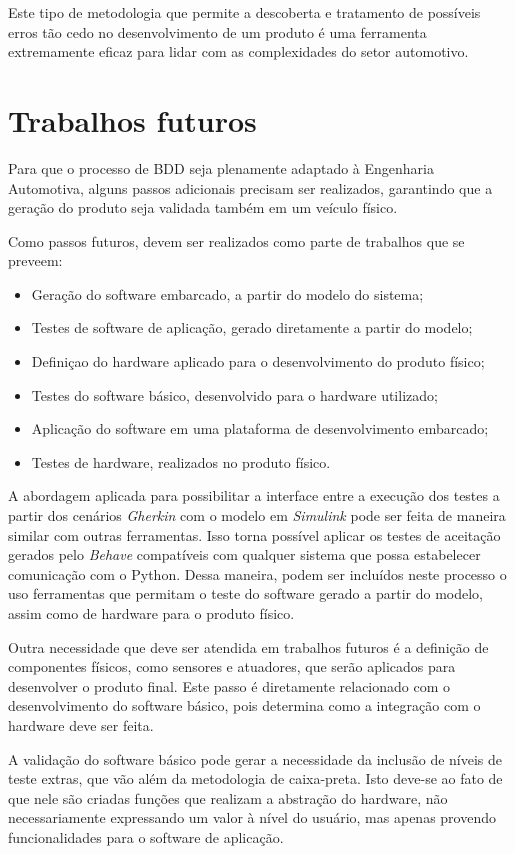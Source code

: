 Este tipo de metodologia que permite a descoberta e tratamento de possíveis erros tão cedo no desenvolvimento de um produto é uma ferramenta extremamente eficaz para 
lidar com as complexidades do setor automotivo.

\section{Trabalhos futuros}

Para que o processo de BDD seja plenamente adaptado à Engenharia Automotiva, alguns passos adicionais precisam ser realizados, garantindo que a geração do 
produto seja validada também em um veículo físico.

Como passos futuros, devem ser realizados como parte de trabalhos que se preveem:

\begin{itemize} 
    \item Geração do software embarcado, a partir do modelo do sistema;
    \item Testes de software de aplicação, gerado diretamente a partir do modelo;
    \item Definiçao do hardware aplicado para o desenvolvimento do produto físico;
    \item Testes do software básico, desenvolvido para o hardware utilizado;
    \item Aplicação do software em uma plataforma de desenvolvimento embarcado;
    \item Testes de hardware, realizados no produto físico.
\end{itemize}

A abordagem aplicada para possibilitar a interface entre a execução dos testes a partir dos cenários \textit{Gherkin} com o modelo em \textit{Simulink} pode 
ser feita de maneira similar com outras ferramentas. Isso torna possível aplicar os testes de aceitação gerados pelo \textit{Behave} compatíveis com qualquer 
sistema que possa estabelecer comunicação com o Python. Dessa maneira, podem ser incluídos neste processo o uso ferramentas que permitam o teste do software 
gerado a partir do modelo, assim como de hardware para o produto físico.

Outra necessidade que deve ser atendida em trabalhos futuros é a definição de componentes físicos, como sensores e atuadores, que serão aplicados para desenvolver 
o produto final. Este passo é diretamente relacionado com o desenvolvimento do software básico, pois determina como a integração com o hardware deve ser feita. 

A validação do software básico pode gerar a necessidade da inclusão de níveis de teste extras, que vão além da metodologia de caixa-preta. Isto deve-se ao fato 
de que nele são criadas funções que realizam a abstração do hardware, não necessariamente expressando um valor à nível do usuário, mas apenas provendo 
funcionalidades para o software de aplicação.
